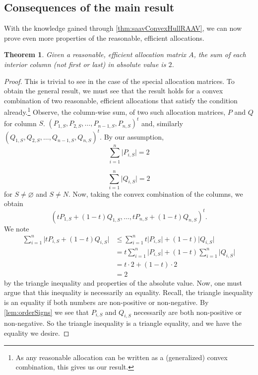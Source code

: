 \documentclass[12pt,letterpaper,final]{article}
\theoremstyle{plain}
\newtheorem{theorem}{Theorem}[section]
\theoremstyle{plain}
\theoremstyle{plain}
\theoremstyle{plain}
\theoremstyle{plain}
\theoremstyle{plain}
\theoremstyle{plain}
\theoremstyle{definition}
\theoremstyle{definition}
\theoremstyle{definition}
\theoremstyle{definition}
\theoremstyle{definition}
\theoremstyle{remark}
\theoremstyle{remark}
\theoremstyle{remark}
\theoremstyle{remark}
\begin{document}
\subsection{Consequences of the main result}

With the knowledge gained through
\cref{thm:saavConvexHullRAAV}, we can now prove even more
properties of the reasonable, efficient allocations. 

\begin{theorem}
  Given a reasonable, efficient allocation matrix \(A\), the sum of each interior column
  (not first or last) in absolute value is \(2\).
\end{theorem}

\begin{proof}
  This is trivial to see in the case of the special allocation
  matrices. To obtain the general result, we must see that the result
  holds for a convex combination of two reasonable, efficient allocations
  that satisfy the condition already.\footnote{As any reasonable
    allocation can be written as a (generalized) convex combination,
    this gives us our result.}
  Observe, the column-wise sum, of two such allocation
  matrices, \(P\) and
  \(Q\) for column \(S\).
  \({\left(
    P_{1,S} , P_{2,S} , \ldots , P_{n-1,S} , P_{n,S}
  \right)}^t\)
  and, similarly
  \({\left(
    Q_{1,S} , Q_{2,S} , \ldots , Q_{n-1,S} , Q_{n,S}
  \right)}^t\).
  By our assumption,
  \[
    \sum_{i=1}^n \lvert P_{i,S} \rvert = 2
  \]

  \[
    \sum_{i=1}^n \lvert Q_{i,S} \rvert = 2
  \]
  for \(S \neq \varnothing\) and \(S\neq N\). 
  Now, taking the convex combination  of the columns, we obtain
  \[
    {\left(
      t P_{1,S}+(1-t) Q_{1,S}  , \ldots , t P_{n,S}+(1-t) Q_{n,S} 
    \right)}^t.
  \]
  We note
  \begin{align*}
    \sum_{i=1}^n \lvert t P_{i,S}+(1-t) Q_{i,S} \rvert & \leq
    \sum_{i=1}^n t\lvert P_{i,S} \rvert + (1-t) \lvert Q_{i,S}
                                                         \rvert\\ 
    & = t \sum_{i=1}^n \lvert P_{i,S} \rvert + (1-t)\sum_{i=1}^n \lvert
      Q_{i,S} \rvert\\
                                                       &= t \cdot 2 +
                                                         (1-t) \cdot 2\\
    &= 2
  \end{align*}
  by the triangle inequality and properties of the absolute
  value.  Now, one must argue that this inequality is necessarily an
  equality.  Recall, the triangle inequality is an equality if both
  numbers are non-positive or non-negative. By
  \cref{lem:orderSigns} we see that \(P_{i,S}\) and
  \(Q_{i,S}\) necessarily are both non-positive or non-negative. So
  the triangle inequality is a triangle equality, and we have the
  equality we desire. 
\end{proof}
\end{document}

